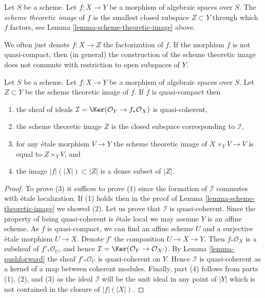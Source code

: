 \begin{definition}
\label{definition-scheme-theoretic-image}
Let $S$ be a scheme. Let $f : X \to Y$ be a morphism of algebraic spaces
over $S$. The {\it scheme theoretic image} of $f$ is the smallest closed
subspace $Z \subset Y$ through which $f$
factors, see Lemma \ref{lemma-scheme-theoretic-image} above.
\end{definition}

\noindent
We often just denote $f : X \to Z$ the factorization of $f$.
If the morphism $f$ is not quasi-compact, then (in general) the
construction of the scheme theoretic image does not commute with
restriction to open subspaces of $Y$.

\begin{lemma}
\label{lemma-quasi-compact-scheme-theoretic-image}
Let $S$ be a scheme.
Let $f : X \to Y$ be a morphism of algebraic spaces over $S$.
Let $Z \subset Y$ be the scheme theoretic image of $f$.
If $f$ is quasi-compact then
\begin{enumerate}
\item the sheaf of ideals
$\mathcal{I} = \Ker(\mathcal{O}_Y \to f_*\mathcal{O}_X)$
is quasi-coherent,
\item the scheme theoretic image $Z$ is the closed subspace
corresponding to $\mathcal{I}$,
\item for any \'etale morphism $V \to Y$ the scheme theoretic image of
$X \times_Y V \to V$ is equal to $Z \times_Y V$, and
\item the image $|f|(|X|) \subset |Z|$ is a dense subset of $|Z|$.
\end{enumerate}
\end{lemma}

\begin{proof}
To prove (3) it suffices to prove (1) since the
formation of $\mathcal{I}$ commutes with \'etale localization.
If (1) holds then in the proof of Lemma \ref{lemma-scheme-theoretic-image}
we showed (2). Let us prove that $\mathcal{I}$ is quasi-coherent.
Since the property of being quasi-coherent is \'etale local we may
assume $Y$ is an affine scheme. As $f$ is quasi-compact,
we can find an affine scheme $U$ and a surjective \'etale morphism
$U \to X$. Denote $f'$ the composition $U \to X \to Y$.
Then $f_*\mathcal{O}_X$ is a subsheaf of $f'_*\mathcal{O}_U$,
and hence $\mathcal{I} = \Ker(\mathcal{O}_Y \to \mathcal{O}_{X'})$.
By Lemma \ref{lemma-pushforward}
the sheaf $f'_*\mathcal{O}_U$ is quasi-coherent on $Y$. Hence $\mathcal{I}$
is quasi-coherent as a kernel of a map between coherent modules.
Finally, part (4) follows from parts (1), (2), and (3) as the ideal
$\mathcal{I}$ will be the unit ideal in any point of $|Y|$ which is
not contained in the closure of $|f|(|X|)$.
\end{proof}

